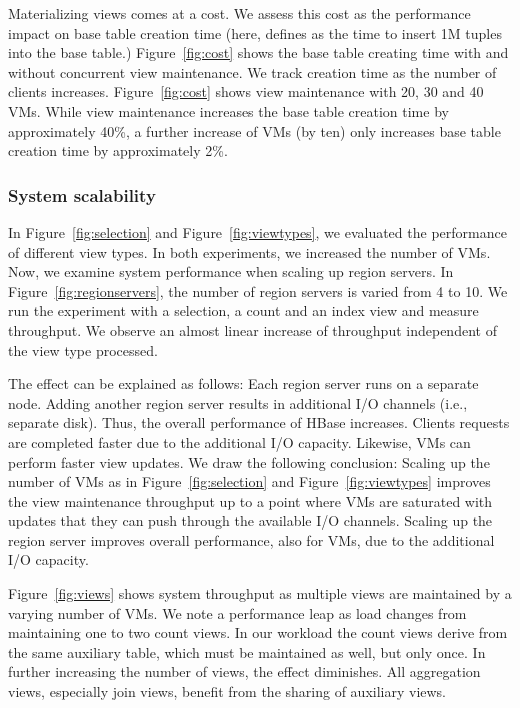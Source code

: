 Materializing views comes at a cost. We assess this cost as the
performance impact on base table creation time (here, defines as the
time to insert 1M tuples into the base table.)  Figure~\ref{fig:cost}
shows the base table creating time with and without concurrent view
maintenance.  We track creation time as the number of clients
increases.  Figure~\ref{fig:cost} shows view maintenance with 20, 30
and 40 VMs.  While view maintenance increases the base table creation
time by approximately 40\%, a further increase of VMs (by ten) only
increases base table creation time by approximately 2\%.


\subsubsection{System scalability}  
In Figure~\ref{fig:selection} and
Figure~\ref{fig:viewtypes}, we evaluated the performance of different
view types. In both experiments, we increased the number of VMs.  Now,
we examine system performance when scaling up region servers. In
Figure~\ref{fig:regionservers}, the number of region servers is varied
from 4 to 10. We run the experiment with a selection, a count and an
index view and measure throughput. We observe an almost linear
increase of throughput independent of the view type processed.

The effect can be explained as follows: Each region server runs on a
separate node. Adding another region server results in additional I/O
channels (i.e., separate disk).  Thus, the overall performance of
HBase increases. Clients requests are completed faster due to the
additional I/O capacity.  Likewise, VMs can perform faster view
updates.  We draw the following conclusion: Scaling up the number of
VMs as in Figure~\ref{fig:selection} and Figure~\ref{fig:viewtypes}
improves the view maintenance throughput up to a point where VMs are
saturated with updates that they can push through the available I/O
channels.  Scaling up the region server improves overall performance,
also for VMs, due to the additional I/O capacity.

Figure~\ref{fig:views} shows system throughput as multiple views are
maintained by a varying number of VMs.  We note a performance leap as
load changes from maintaining one to two count views. In our workload
the count views derive from the same auxiliary table, which must be
maintained as well, but only once. In further increasing the number of
views, the effect diminishes.  All aggregation views, especially join
views, benefit from the sharing of auxiliary views.

